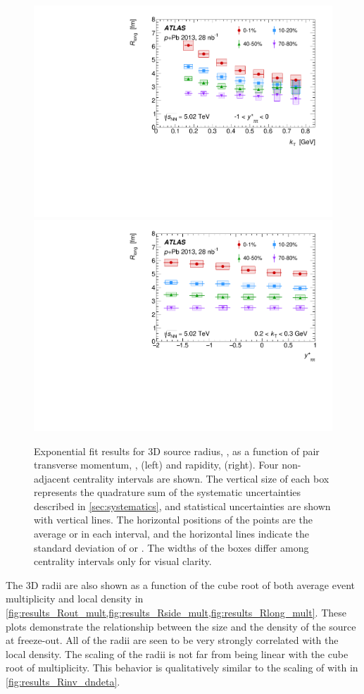 \begin{figure}[ht]
\centering
\includegraphics[width=.49\linewidth]{canqosl_Rlong_vs_kt.pdf}
\includegraphics[width=.49\linewidth]{canqosl_Rlong_vs_kys.pdf}
\caption{Exponential fit results for 3D source radius, \Rlong, as a function of pair transverse momentum, \kt, (left) and rapidity, \kys (right). Four non-adjacent centrality intervals are shown. The vertical size of each box represents the quadrature sum of the systematic uncertainties described in \cref{sec:systematics}, and statistical uncertainties are shown with vertical lines. The horizontal positions of the points are the average \kt or \kys in each interval, and the horizontal lines indicate the standard deviation of \kt or \kys. The widths of the boxes differ among centrality intervals only for visual clarity.}
\label{fig:results_Rlong}
\end{figure}

The 3D radii are also shown as a function of the cube root of both average event multiplicity and local density
in \cref{fig:results_Rout_mult,fig:results_Rside_mult,fig:results_Rlong_mult}.
These plots demonstrate the relationship between the size and the density of the source at freeze-out.
All of the radii are seen to be very strongly correlated with the local density.
The scaling of the radii is not far from being linear with the cube root of multiplicity.
This behavior is qualitatively similar to the scaling of \Rinv with \avgdNdeta in \cref{fig:results_Rinv_dndeta}.


